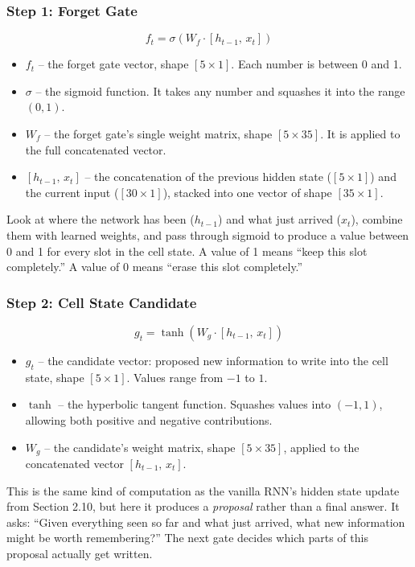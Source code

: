 \documentclass[12pt,a4paper]{article}
\begin{document}
\subsubsection{Step 1: Forget Gate}

\[
f_t = \sigma(W_f \cdot [h_{t-1},\, x_t])
\]

\begin{itemize}
    \item $f_t$ -- the forget gate vector, shape $[5 \times 1]$. Each number is
    between 0 and 1.
    \item $\sigma$ -- the sigmoid function. It takes any number and squashes it into
    the range $(0, 1)$.
    \item $W_f$ -- the forget gate's single weight matrix, shape $[5 \times 35]$.
    It is applied to the full concatenated vector.
    \item $[h_{t-1},\, x_t]$ -- the concatenation of the previous hidden state
    ($[5 \times 1]$) and the current input ($[30 \times 1]$), stacked into one
    vector of shape $[35 \times 1]$.
\end{itemize}

Look at where the network has been ($h_{t-1}$) and what just arrived ($x_t$),
combine them with learned weights, and pass through sigmoid to produce a value
between 0 and 1 for every slot in the cell state. A value of 1 means ``keep this
slot completely.'' A value of 0 means ``erase this slot completely.''

\subsubsection{Step 2: Cell State Candidate}

\[
g_t = \tanh(W_g \cdot [h_{t-1},\, x_t])
\]

\begin{itemize}
    \item $g_t$ -- the candidate vector: proposed new information to write into the
    cell state, shape $[5 \times 1]$. Values range from $-1$ to $1$.
    \item $\tanh$ -- the hyperbolic tangent function. Squashes values into
    $(-1, 1)$, allowing both positive and negative contributions.
    \item $W_g$ -- the candidate's weight matrix, shape $[5 \times 35]$, applied to
    the concatenated vector $[h_{t-1},\, x_t]$.
\end{itemize}

This is the same kind of computation as the vanilla RNN's hidden state update from
Section 2.10, but here it produces a \textit{proposal} rather than a final answer.
It asks: ``Given everything seen so far and what just arrived, what new information
might be worth remembering?'' The next gate decides which parts of this proposal
actually get written.
\end{document}
